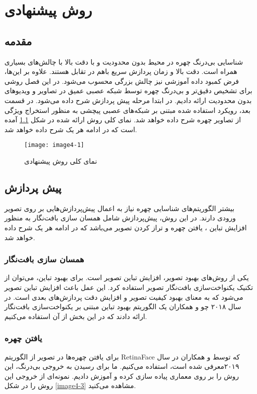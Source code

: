\chapter{ روش پیشنهادی }
\section{مقدمه}

شناسایی بی‌درنگ چهره در محیط بدون محدودیت و با دقت بالا با چالش‌های بسیاری همراه است. دقت بالا و زمان پردازش سریع باهم در تقابل  هستند. علاوه بر این‌ها، فرض ‌کمبود داده آموزشی نیز چالش بزرگی محسوب می‌شود. در این فصل روشی برای تشخیص دقیق‌تر و بی‌درنگ چهره توسط شبکه عصبی عمیق در تصاویر و ویدیوهای بدون محدودیت ارائه دادیم. در ابتدا مرحله پیش پردازش شرح داده می‌شود. در قسمت بعد، رویكرد استفاده شده مبتنی بر شبكه‌های عصبی پیچشی به منظور استخراج ویژگی از تصاویر چهره شرح داده خواهد شد. نمای کلی روش ارائه شده در شكل \ref{image4-2} آمده است كه در ادامه هر یک شرح داده خواهد شد.

\begin{figure}[h]
	\label{image4-2}
	\centering
  	\texttt{[image: image4-1]}
  	\caption{نمای کلی روش پیشنهادی}
\end{figure}

\section{پیش پردازش}
بیشتر الگوریتم‌ها‌ی شناسایی چهره نیاز به اعمال پیش‌پردازش‌هایی بر روی تصویر ورودی دارند. در این روش، پیش‌پردازش شامل همسان سازی بافت‌نگار  به منظور افزایش تباین ، یافتن چهره و تراز کردن تصویر می‌باشد كه در ادامه هر یک شرح داده خواهد شد.

\subsection{همسان سازی بافت‌نگار}
یکی از روش‌های بهبود تصویر، افزایش تباین تصویر است. برای بهبود تباین، می‌توان از تکنیک یکنواخت‌سازی بافت‌نگار تصویر استفاده کرد. این عمل باعث افزایش تباین تصویر  می‌شود که به معنای بهبود کیفیت تصویر و افزایش دقت پردازش‌های بعدی است. در سال ۲۰۱۸ چو و همکاران \cite{s18092995} یک الگوریتم بهبود تباین مبتنی بر یکنواخت‌سازی بافت‌نگار ارائه دادند که در این بخش از آن استفاده می‌کنیم.

\subsection{یافتن چهره}
برای یافتن چهره‌ها در تصویر از الگوریتم RetinaFace که توسط  و همکاران \cite{deng2019retinaface} در سال ۲۰۱۹معرفی شده است، استفاده می‌کنیم. ما برای رسیدن به خروجی بی‌درنگ، این روش را بر روی معماری  پیاده سازی کرده و آموزش دادیم. نمونه‌ای از خروجی این روش را در شکل \ref{image4-3} مشاهده می‌کنید. 

